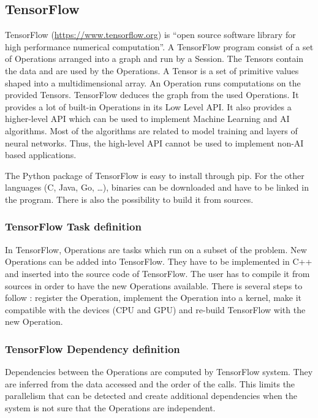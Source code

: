 \subsection{TensorFlow}
TensorFlow \cite{AABBC2016} (\url{https://www.tensorflow.org}) is “open source software library for high performance numerical computation”.
A TensorFlow program consist of a set of Operations arranged into a graph and run by a Session.
The Tensors contain the data and are used by the Operations.
A Tensor is a set of primitive values shaped into a multidimensional array.
An Operation runs computations on the provided Tensors.
TensorFlow deduces the graph from the used Operations.
It provides a lot of built-in Operations in its Low Level API.
It also provides a higher-level API which can be used to implement Machine Learning and AI algorithms.
Most of the algorithms are related to model training and layers of neural networks.
Thus, the high-level API cannot be used to implement non-AI based applications.

The Python package of TensorFlow is easy to install through pip.
For the other languages (C, Java, Go, \dots), binaries can be downloaded and have to be linked in the program.
There is also the possibility to build it from sources.



\subsubsection{TensorFlow Task definition}
In TensorFlow, Operations are tasks which run on a subset of the problem.
New Operations can be added into TensorFlow.
They have to be implemented in C++ and inserted into the source code of TensorFlow.
The user has to compile it from sources in order to have the new Operations available.
There is several steps to follow : register the Operation, implement the Operation into a kernel, make it compatible with the devices (CPU and GPU) and re-build TensorFlow with the new Operation.


\subsubsection{TensorFlow Dependency definition}
Dependencies between the Operations are computed by TensorFlow system.
They are inferred from the data accessed and the order of the calls.
This limits the parallelism that can be detected and create additional dependencies when the system is not sure that the Operations are independent.

